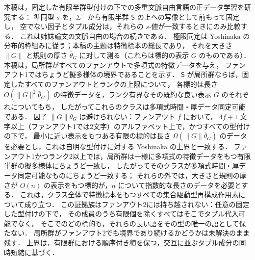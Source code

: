 本稿は，固定した有限半群型付けの下での多重文脈自由言語の正データ学習を研究する：
準同型 $s$ を，$\Sigma^+$ から有限半群 $\mathsf S$ の上への写像として前もって固定し，
空でない因子とタプル成分は，それらの $s$-値が一致するときにのみ比較する．
これは姉妹論文の文脈自由の場合の続きである．
極限同定は Yoshinaka の分布的枠組みに従う；本稿の主題は特徴標本の総長であり，
それを大きさ $\|G\|$ と規則の厚さ $\bar\theta_G$ に対して測る（これらは標的の表示 $G$ のものである）．
本稿は，局所群がすべてのファンアウトで多項式の特徴データを与え，
ファンアウト1ではちょうど擬多様体の境界であることを示す．
$\mathsf S$ が局所群ならば，固定したすべてのファンアウトとランクの上限について，
各標的は長さ $O(\|G\|^2\bar\theta_G)$ の特徴データを，ランク有界なその既約な良い表示 $G$ のそれぞれについてもち，
したがってこれらのクラスは多項式時間・厚データ同定可能である．
因子
$\|G\|\bar\theta_G$ は避けられない：ファンアウト $f$ において，
$4f+1$ 文字以上（ファンアウト1では2文字）のアルファベット上で，かつすべての型付けの下で，
最小に近い表示をもつある有限の標的は長さ
$\Omega(\|G\|\bar\theta_G)$ のデータを必要とし，これは自明な型付けに対する Yoshinaka の上界と一致する．
ファンアウト1かつランク2以上では，局所群は一様に多項式の特徴データをもつ有限半群の擬多様体にちょうど一致し，
したがってそのクラスが多項式時間・厚データ同定可能なものにちょうど一致する；
それらの外では，大きさと規則の厚さが $O(n)$ の表示をもつ標的が，$n$ について指数的な長さのデータを必要とする．
これは，クラス全体で特徴標本をもつすべての集合駆動型再構成作用素について成り立つ．
この証拠族はファンアウト2には持ち越されない：任意の固定した型付けの下で，
その成員のうち有限個を除くすべてはそこでタプル代入可能でなく，
そこでのどの標的も，それらの長い語をその型の唯一の語として保たない．
局所群がファンアウト2でも境界であり続けるかどうかは未解決のまま残す．
上界は，有限群における順序付き積を保つ，交互に並ぶタプル成分の同時短縮に基づく．
